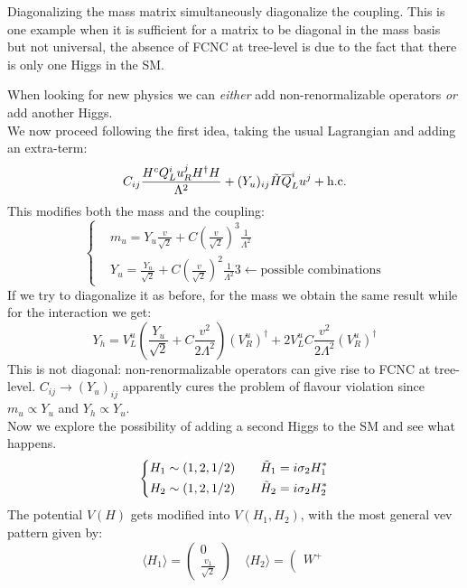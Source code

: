 \documentclass[../main.tex]{subfiles}
\begin{document}
Diagonalizing the mass matrix simultaneously diagonalize the coupling. This is one example when it is sufficient for a matrix to be diagonal in the mass basis but not universal, the absence of FCNC at tree-level is due to the fact that there is only one Higgs in the SM.
\begin{kaobox}[frametitle=Two Higgs doublet model]
When looking for new physics we can \textit{either} add non-renormalizable operators \textit{or} add another Higgs.\\
We now proceed following the first idea, taking the usual Lagrangian and adding an extra-term:
\[
C_{ij}\frac{H^cQ_L^iu_R^jH^\dagger H}{\Lambda^2}+(Y_u)_{ij}\Tilde{H}\overline{Q}_L^iu^j+\text{h.c.}
\]
This modifies both the mass and the coupling:
\[
\left\{
\begin{aligned}
&m_u=Y_u\frac{v}{\sqrt{2}}+C\left(\frac{v}{\sqrt{2}}\right)^3\frac{1}{\Lambda^2}\\
&Y_u=\frac{Y_u}{\sqrt{2}}+C\left(\frac{v}{\sqrt{2}}\right)^2\frac{1}{\Lambda^2}3\xleftarrow[]{}\text{possible combinations}
\end{aligned}
\right.
\]
If we try to diagonalize it as before, for the mass we obtain the same result while for the interaction we get:
\[
Y_h=V_L^u\left(\frac{Y_u}{\sqrt{2}}+C\frac{v^2}{2\Lambda^2}\right)(V_R^u)^\dagger+2V_L^uC\frac{v^2}{2\Lambda^2}(V_R^u)^\dagger
\]
This is not diagonal: non-renormalizable operators can give rise to FCNC at tree-level. $C_{ij}\xrightarrow[]{}(Y_u)_{ij}$ apparently cures the problem of flavour violation since $m_u\propto Y_u$ and $Y_h\propto Y_u$.\\
Now we explore the possibility of adding a second Higgs to the SM and see what happens. 
\[
\left\{
\begin{aligned}
&H_1\sim(1,2,1/2) \quad &&\Tilde{H}_1=i\sigma_2H_1^*\\
&H_2\sim(1,2,1/2) \quad &&\Tilde{H}_2=i\sigma_2H_2^*
\end{aligned}
\right.
\]
The potential $V(H)$ gets modified into $V(H_1,H_2)$, with the most general vev pattern given by:
\[
\langle H_1 \rangle=\left(\begin{array}{c}
     0 \\
     \frac{v_1}{\sqrt{2}}
\end{array}\right)
\quad
\langle H_2 \rangle=\left(\begin{array}{c}
     W^+ \\

\end{array}\]
\end{kaobox}
\end{document}
